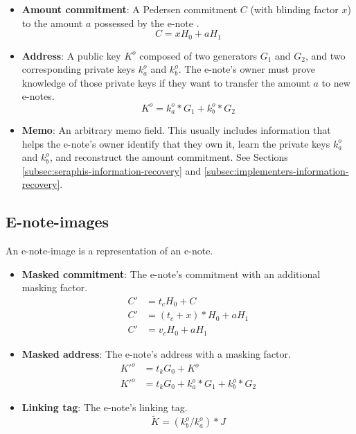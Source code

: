 \begin{itemize}
    \item \textbf{Amount commitment}: A Pedersen commitment $C$ (with blinding factor $x$) to the amount $a$ possessed by the e-note \cite{Pedersen1992, maxwell-ct-2}.
    \[C = x H_0 + a H_1\]

    \item \textbf{Address}: A public key $K^o$ composed of two generators $G_1$ and $G_2$, and two corresponding private keys $k^o_a$ and $k^o_b$. The e-note's owner must prove knowledge of those private keys if they want to transfer the amount $a$ to new e-notes.\vspace{.115cm}
    \[K^o = k^o_a*G_1 + k^o_b*G_2\]

    \item \textbf{Memo}: An arbitrary memo field. This usually includes information that helps the e-note's owner identify that they own it, learn the private keys $k^o_a$ and $k^o_b$, and reconstruct the amount commitment. See Sections \ref{subsec:seraphis-information-recovery} and \ref{subsec:implementers-information-recovery}.
\end{itemize}


\subsection{E-note-images}
\label{subsec:seraphis-e-note-images}

An e-note-image is a representation of an e-note.

\begin{itemize}
    \item \textbf{Masked commitment}: The e-note's commitment with an additional masking factor.\vspace{.115cm}
    \begin{align*}
        C' &= t_c H_0 + C \\
        C' &= (t_c + x)*H_0 + a H_1 \\
        C' &= v_c H_0 + a H_1
    \end{align*}

    \item \textbf{Masked address}: The e-note's address with a masking factor.\vspace{.115cm}
    \begin{align*}
        K'^o &= t_k G_0 + K^o \\
        K'^o &= t_k G_0 + k^o_a*G_1 + k^o_b*G_2
    \end{align*}

    \item \textbf{Linking tag}: The e-note's linking tag.\vspace{.115cm}
    \[\tilde{K} = (k^o_b/k^o_a)*J\]
\end{itemize}

